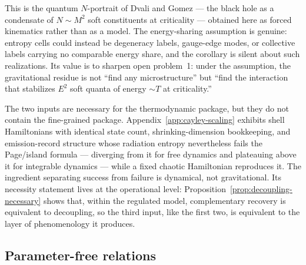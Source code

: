 \documentclass[12pt]{article}
\begin{document}
This is the quantum $N$-portrait of Dvali and Gomez --- the black hole
as a condensate of $N\sim M^2$ soft constituents at criticality
\cite{DvaliGomez2013} --- obtained here as forced kinematics rather than
as a model.  The energy-sharing assumption is genuine: entropy cells
could instead be degeneracy labels, gauge-edge modes, or collective
labels carrying no comparable energy share, and the corollary is silent
about such realizations.  Its value is to sharpen open problem~1: under
the assumption, the gravitational residue is not ``find any
microstructure'' but ``find the interaction that stabilizes $E^2$ soft
quanta of energy $\sim T$ at criticality.''

The two inputs are necessary for the thermodynamic package, but they do not
contain the fine-grained package.  Appendix~\ref{app:cayley-scaling} exhibits
shell Hamiltonians with identical state count, shrinking-dimension
bookkeeping, and emission-record structure whose radiation entropy
nevertheless fails the Page/island formula --- diverging from it for free
dynamics and plateauing above it for integrable dynamics --- while a fixed
chaotic Hamiltonian reproduces it.  The ingredient separating success from
failure is dynamical, not gravitational.  Its necessity statement lives at
the operational level: Proposition~\ref{prop:decoupling-necessary} shows
that, within the regulated model, complementary recovery is equivalent to
decoupling, so the third input, like the first two, is equivalent to the
layer of phenomenology it produces.

\subsection{Parameter-free relations}
\label{sec:cross-relations}
\end{document}
